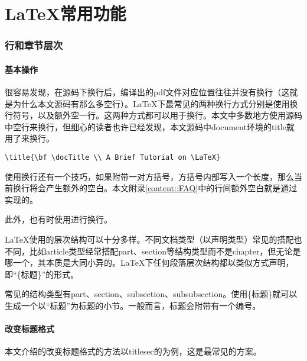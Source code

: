 
\part{\LaTeX 常用功能}

\section{行和章节层次}

\subsection{基本操作}

很容易发现，在源码下换行后，编译出的pdf文件对应位置往往并没有换行（这就是为什么本文源码有那么多空行）。\LaTeX 下最常见的两种换行方式分别是使用换行符号\textlb，以及额外空一行。这两种方式都可以用于换行。本文中多数地方使用源码中空行来换行，但细心的读者也许已经发现，本文源码中document环境的title就用了\textlb 来换行。

\begin{lstlisting}[style = latex_texworks, numbers = none]
\title{\bf \docTitle \\ A Brief Tutorial on \LaTeX}
\end{lstlisting}

使用\textlb 换行还有一个技巧，如果附带一对方括号，方括号内部写入一个长度，那么当前换行将会产生额外的空白。本文附录\ref*{content::FAQ}中的行间额外空白就是通过\textlb[5mm]实现的。

此外，也有时使用进行换行。

\LaTeX 使用的层次结构可以十分多样。不同文档类型（以声明类型）常见的搭配也不同，比如article类型经常搭配part、section等结构类型而不是chapter，但无论是哪一个，其本质是大同小异的。\LaTeX 下任何段落层次结构都以类似方式声明，即“\{标题\}”的形式。

常见的结构类型有part、section、subsection、subsubsection。使用\{标题\}就可以生成一个以“标题”为标题的小节。一般而言，标题会附带有一个编号。

\subsection{改变标题格式\label{content::title_format_tutorial}}

本文介绍的改变标题格式的方法以titlesec的为例，这是最常见的方案。

